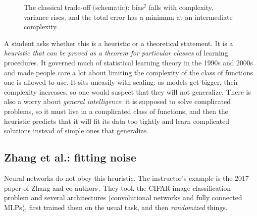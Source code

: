 \begin{figure}[tb]
\centering
{}
\caption{The classical trade-off (schematic): bias$^2$ falls with complexity, variance rises, and the total error has a minimum at an intermediate complexity.}
\label{fig:L3-ucurve}
\end{figure}

\begin{discussion}
A student asks whether this is a heuristic or a theoretical statement. It is a \emph{heuristic that can be proved as a theorem for particular classes} of learning procedures. It governed much of statistical learning theory in the 1990s and 2000s and made people care a lot about limiting the complexity of the class of functions one is allowed to use.
It sits uneasily with scaling: as models get bigger, their complexity increases, so one would suspect that they will not generalize.
There is also a worry about \emph{general intelligence}: it is supposed to solve complicated problems, so it must live in a complicated class of functions, and then the heuristic predicts that it will fit its data too tightly and learn complicated solutions instead of simple ones that generalize.
\end{discussion}

\subsection{Zhang et al.: fitting noise}\label{sec:L3-zhang}
Neural networks do not obey this heuristic. The instructor's example is the 2017 paper of Zhang and co-authors\,\citep{zhang2017}. They took the CIFAR image-classification problem and several architectures (convolutional networks and fully connected MLPs), first trained them on the usual task, and then \emph{randomized} things.

